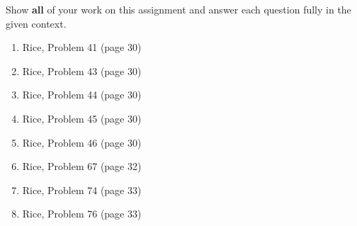 \documentclass[11pt]{article}
\newcommand{\ben}{\begin{enumerate}}
\newcommand{\een}{\end{enumerate}}
\begin{document}
\pagestyle{fancy} 

Show \textbf{all} of your work on this assignment and answer each question fully in the given context.

\ben

\item Rice, Problem 41 (page 30)

\item Rice, Problem 43 (page 30)

\item Rice, Problem 44 (page 30)

\item Rice, Problem 45 (page 30)

\item Rice, Problem 46 (page 30)

\item Rice, Problem 67 (page 32)

\item Rice, Problem 74 (page 33)

\item Rice, Problem 76 (page 33)

\een
\end{document}
